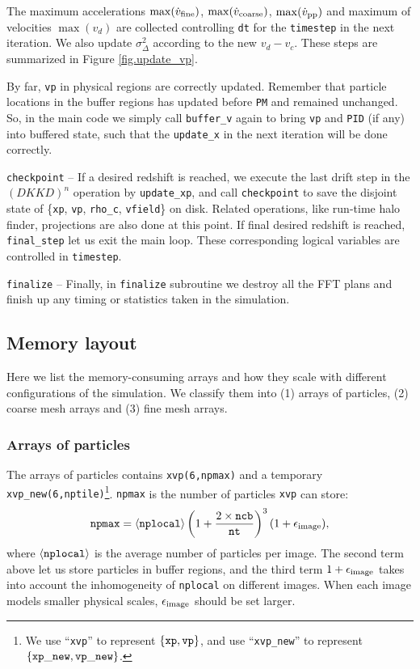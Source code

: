 \documentclass[10pt,twocolumn,preprint]{emulateapj}
\begin{document}
The maximum accelerations $\max(\dot{v}_{\rm fine})$, $\max(\dot{v}_{\rm coarse})$, $\max(\dot{v}_{\rm pp})$ and maximum of velocities $\max(v_d)$ are collected controlling {\tt dt} for the {\tt timestep} in the next iteration. We also update $\sigma^2_{\Delta}$ according to the new $v_d-v_c$. These steps are summarized in Figure \ref{fig.update_vp}.

By far, {\tt vp} in physical regions are correctly updated. Remember that particle locations in the buffer regions has updated before {\tt PM} and remained unchanged. So, in the main code we simply call {\tt buffer\_v} again to bring {\tt vp} and {\tt PID} (if any) into buffered state, such that the {\tt update\_x} in the next iteration will be done correctly.

{\tt checkpoint} -- 
If a desired redshift is reached, we execute the last drift step in the $(DKKD)^n$ operation by {\tt update\_xp}, and call {\tt checkpoint} to save the disjoint state of \{{\tt xp}, {\tt vp}, {\tt rho\_c}, {\tt vfield}\} on disk. Related operations, like run-time halo finder, projections are also done at this point. If final desired redshift is reached, {\tt final\_step} let us exit the main loop. These corresponding logical variables are controlled in {\tt timestep}.

{\tt finalize} --
Finally, in {\tt finalize} subroutine we destroy all the FFT plans and finish up any timing or statistics taken in the simulation.

\subsection{Memory layout}\label{ss.memory}
Here we list the memory-consuming arrays and how they scale with different configurations of the simulation. We classify them into (1) arrays of particles, (2) coarse mesh arrays and (3) fine mesh arrays.

\subsubsection{Arrays of particles}
The arrays of particles contains {\tt xvp(6,npmax)} and a temporary {\tt xvp\_new(6,nptile)}\footnote{We use ``{\tt xvp}'' to represent $\{{\tt xp},{\tt vp}\}$, and use ``{\tt xvp\_new}'' to represent $\{{\tt xp\_new},{\tt vp\_new}\}$.}. {\tt npmax} is the number of particles {\tt xvp} can store:
\begin{equation}\label{eq.npmax}
	{\tt npmax}=\left\langle {\tt nplocal} \right\rangle \left( 1+\frac{2\times {\tt ncb}}{\tt nt} \right)^3(1+\epsilon_{\rm image}),
\end{equation}
where $\left\langle {\tt nplocal} \right\rangle$ is the average number of particles per image. The second term above let us store particles in buffer regions, and the third term $1+\epsilon_{\rm image}$ takes into account the inhomogeneity of {\tt nplocal} on different images. When each image models smaller physical scales, $\epsilon_{\rm image}$ should be set larger. 
\end{document}
